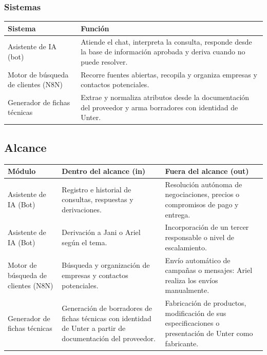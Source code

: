 \documentclass{article}
\begin{document}
\subsubsection*{Sistemas}

\begin{table}[H]
\centering
\begin{tabularx}{\textwidth}{lL}
\toprule
\textbf{Sistema} & \textbf{Función} \\
\midrule
Asistente de IA (bot) & Atiende el chat, interpreta la consulta, responde desde la base de información aprobada y deriva cuando no puede resolver. \\
Motor de búsqueda de clientes (N8N) & Recorre fuentes abiertas, recopila y organiza empresas y contactos potenciales. \\
Generador de fichas técnicas & Extrae y normaliza atributos desde la documentación del proveedor y arma borradores con identidad de Unter. \\
\bottomrule
\end{tabularx}
\end{table}

\subsection{Alcance}

\begin{table}[H]
\centering
\small
\begin{tabularx}{\textwidth}{lLL}
\toprule
\textbf{Módulo} & \textbf{Dentro del alcance (in)} & \textbf{Fuera del alcance (out)} \\
\midrule
Asistente de IA (Bot) & Registro e historial de consultas, respuestas y derivaciones. & Resolución autónoma de negociaciones, precios o compromisos de pago y entrega. \\
\addlinespace
Asistente de IA (Bot) & Derivación a Jani o Ariel según el tema. & Incorporación de un tercer responsable o nivel de escalamiento. \\
\addlinespace
Motor de búsqueda de clientes (N8N) & Búsqueda y organización de empresas y contactos potenciales. & Envío automático de campañas o mensajes: Ariel realiza los envíos manualmente. \\
\addlinespace
Generador de fichas técnicas & Generación de borradores de fichas técnicas con identidad de Unter a partir de documentación del proveedor. & Fabricación de productos, modificación de sus especificaciones o presentación de Unter como fabricante. \\
\bottomrule
\end{tabularx}
\end{table}
\end{document}

